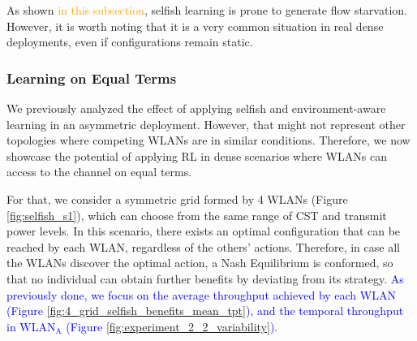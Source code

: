 \documentclass[preprint,12pt]{elsarticle}
\begin{document}
As shown \textcolor{orange}{in this subsection}, selfish learning is prone to generate flow starvation. However, it is worth noting that it is a very common situation in real dense deployments, even if configurations remain static.

\subsubsection{Learning on Equal Terms}
\label{subsubsection:resources_maximization}

We previously analyzed the effect of applying selfish and environment-aware learning in an asymmetric deployment. However, that might not represent other topologies where competing WLANs are in similar conditions. Therefore, we now showcase the potential of applying RL in dense scenarios where WLANs can access to the channel on equal terms. 

For that, we consider a symmetric grid formed by 4 WLANs (Figure \ref{fig:selfish_s1}), which can choose from the same range of CST and transmit power levels. In this scenario, there exists an optimal configuration that can be reached by each WLAN, regardless of the others' actions. Therefore, in case all the WLANs discover the optimal action, a Nash Equilibrium is conformed, so that no individual can obtain further benefits by deviating from its strategy. \textcolor{blue}{As previously done, we focus on the average throughput achieved by each WLAN (Figure \ref{fig:4_grid_selfish_benefits_mean_tpt}), and the temporal throughput in $\text{WLAN}_\text{A}$ (Figure \ref{fig:experiment_2_2_variability}).}
\end{document}
